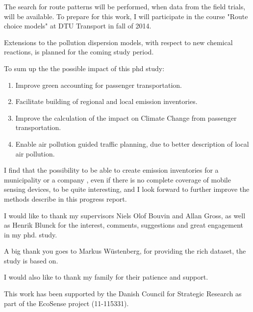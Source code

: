 The search for route patterns will be performed, when data from the field trials, will be available. To prepare for this work, I will participate in the course "Route choice models" at DTU Transport in fall of 2014.

Extensions to the pollution dispersion models, with respect to new chemical reactions, is planned for the coming study period.

To sum up the the possible impact of this phd study:

\begin{enumerate}
	\item Improve green accounting for passenger transportation.
	\item Facilitate building of regional and local emission inventories.
	\item Improve the calculation of the impact on Climate Change from passenger transportation.
	\item Enable air pollution guided traffic planning, due to better description of local air pollution.
\end{enumerate} 
I find that the possibility to be able to create emission inventories for a municipality or a company , even if there is no complete coverage of mobile sensing devices, to be quite interesting, and I look forward to further improve the methods describe in this progress report.

I would like to thank my supervisors Niels Olof Bouvin and Allan Gross, as well as Henrik Blunck for the interest, comments, suggestions and great engagement in my phd. study. 

A big thank you goes to Markus W\"ustenberg, for providing the rich dataset, the study is based on.

I would also like to thank my family for their patience and support.

\vspace{20pt}
This work has been supported by the Danish Council for Strategic Research as part of the EcoSense project (11-115331).